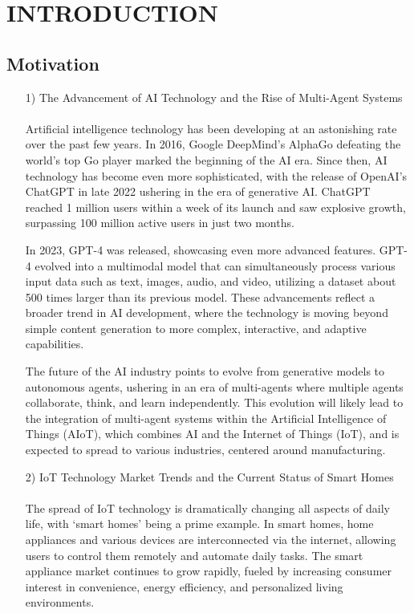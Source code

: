 \documentclass[conference]{IEEEtran}
\begin{document}
\section{INTRODUCTION}

\subsection{Motivation}

\begin{itemize}
    \item [1)] The Advancement of AI Technology and the Rise of Multi-Agent Systems \\ \\
     Artificial intelligence technology has been developing at an astonishing rate over the past few years. In 2016, Google DeepMind's AlphaGo defeating the world's top Go player marked the beginning of the AI era. Since then, AI technology has become even more sophisticated, with the release of OpenAI's ChatGPT in late 2022 ushering in the era of generative AI. ChatGPT reached 1 million users within a week of its launch and saw explosive growth, surpassing 100 million active users in just two months.

    \hspace{1em} In 2023, GPT-4 was released, showcasing even more advanced features. GPT-4 evolved into a multimodal model that can simultaneously process various input data such as text, images, audio, and video, utilizing a dataset about 500 times larger than its previous model. These advancements reflect a broader trend in AI development, where the technology is moving beyond simple content generation to more complex, interactive, and adaptive capabilities.
    
    \hspace{1em} The future of the AI industry points to evolve from generative models to autonomous agents, ushering in an era of multi-agents where multiple agents collaborate, think, and learn independently. This evolution will likely lead to the integration of multi-agent systems within the Artificial Intelligence of Things (AIoT), which combines AI and the Internet of Things (IoT), and is expected to spread to various industries, centered around manufacturing. \\

    \item [2)] IoT Technology Market Trends and the Current Status of Smart Homes  \\ \\
    The spread of IoT technology is dramatically changing all aspects of daily life, with `smart homes' being a prime example. In smart homes, home appliances and various devices are interconnected via the internet, allowing users to control them remotely and automate daily tasks.  The smart appliance market continues to grow rapidly, fueled by increasing consumer interest in convenience, energy efficiency, and personalized living environments. 


\end{itemize}
\end{document}
